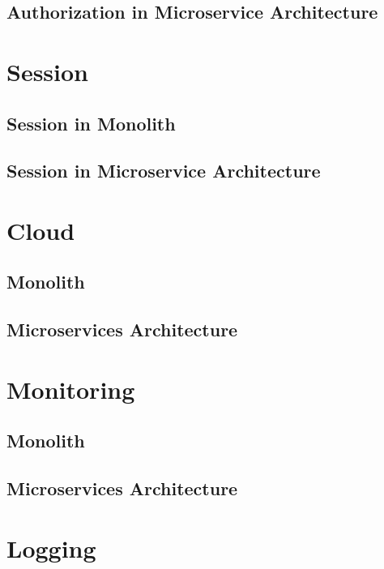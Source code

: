 \subsection{Authorization in Microservice Architecture}




\section{Session}
\subsection{Session in Monolith}
\subsection{Session in Microservice Architecture}




\section{Cloud}
\subsection{Monolith}
\subsection{Microservices Architecture}



\section{Monitoring}
\subsection{Monolith}
\subsection{Microservices Architecture}



\section{Logging}
